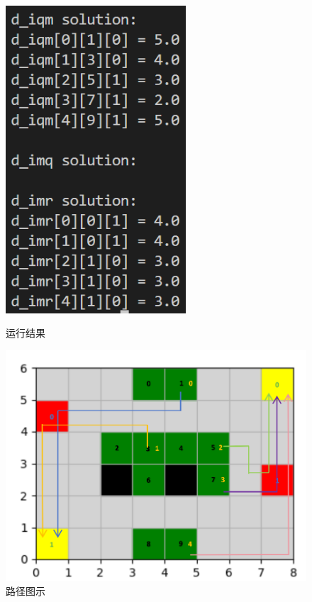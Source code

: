 \documentclass[withoutpreface,bwprint]{thesis-config}
\begin{document}
\begin{figure}[!htbp]
    \centering
        \begin{minipage}[b]{0.4\linewidth}
            \centering
            \includegraphics[width=0.6\textwidth]{figures/result2.1.png}
            \caption{运行结果}
        \end{minipage}%
        \begin{minipage}[b]{0.58\linewidth}
            \centering
            \includegraphics[width=1\textwidth]{figures/2.1.png}
            \caption{路径图示}
        \end{minipage}
\end{figure}
\end{document}
